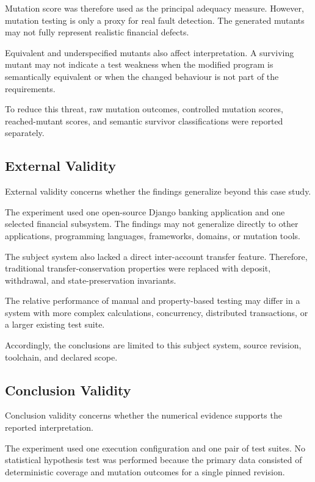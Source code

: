 \documentclass[12pt]{article}
\begin{document}
Mutation score was therefore used as the principal adequacy measure. However,
mutation testing is only a proxy for real fault detection. The generated
mutants may not fully represent realistic financial defects.

Equivalent and underspecified mutants also affect interpretation. A surviving
mutant may not indicate a test weakness when the modified program is
semantically equivalent or when the changed behaviour is not part of the
requirements.

To reduce this threat, raw mutation outcomes, controlled mutation scores,
reached-mutant scores, and semantic survivor classifications were reported
separately.

\subsection{External Validity}

External validity concerns whether the findings generalize beyond this case
study.

The experiment used one open-source Django banking application and one selected
financial subsystem. The findings may not generalize directly to other
applications, programming languages, frameworks, domains, or mutation tools.

The subject system also lacked a direct inter-account transfer feature.
Therefore, traditional transfer-conservation properties were replaced with
deposit, withdrawal, and state-preservation invariants.

The relative performance of manual and property-based testing may differ in a
system with more complex calculations, concurrency, distributed transactions,
or a larger existing test suite.

Accordingly, the conclusions are limited to this subject system, source
revision, toolchain, and declared scope.

\subsection{Conclusion Validity}

Conclusion validity concerns whether the numerical evidence supports the
reported interpretation.

The experiment used one execution configuration and one pair of test suites.
No statistical hypothesis test was performed because the primary data
consisted of deterministic coverage and mutation outcomes for a single pinned
revision.
\end{document}
